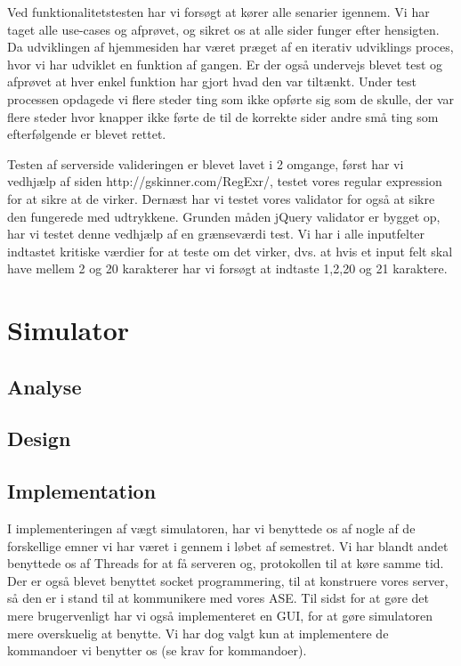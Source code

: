 \documentclass[a4paper]{article}
\begin{document}
Ved funktionalitetstesten har vi forsøgt at kører alle senarier igennem. Vi har taget alle use-cases og afprøvet, og sikret os at alle sider funger efter hensigten. Da udviklingen af hjemmesiden har været præget af en iterativ udviklings proces, hvor vi har udviklet en funktion af gangen. Er der også undervejs blevet test og afprøvet at hver enkel funktion har gjort hvad den var tiltænkt. Under test processen opdagede vi flere steder ting som ikke opførte sig som de skulle, der var flere steder hvor knapper ikke førte de til de korrekte sider andre små ting som efterfølgende er blevet rettet. 

Testen af serverside valideringen er blevet lavet i 2 omgange, først har vi vedhjælp af siden http://gskinner.com/RegExr/, testet vores regular expression for at sikre at de virker. Dernæst har vi testet vores validator for også at sikre den fungerede med udtrykkene. Grunden måden jQuery validator er bygget op, har vi testet denne vedhjælp af en grænseværdi test. Vi har i alle inputfelter indtastet kritiske værdier for at teste om det virker, dvs. at hvis et input felt skal have mellem 2 og 20 karakterer har vi forsøgt at indtaste 1,2,20 og 21 karaktere.  



\section{Simulator} %

\subsection{Analyse} %


\subsection{Design} %


\subsection{Implementation} %

I implementeringen af vægt simulatoren, har vi benyttede os af nogle af de forskellige emner vi har været i gennem i løbet af semestret. Vi har blandt andet benyttede os af Threads for at få serveren og, protokollen til at køre samme tid. Der er også blevet benyttet socket programmering, til at konstruere vores server, så den er i stand til at kommunikere med vores ASE. Til sidst for at gøre det mere brugervenligt har vi også implementeret en GUI, for at gøre simulatoren mere overskuelig at benytte. Vi har dog valgt kun at implementere de kommandoer vi benytter os (se krav for kommandoer).
\end{document}
